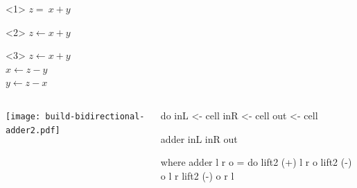 \documentclass[UKenglish,usenames,dvipsnames,svgnames,table,aspectratio=169,mathserif]{beamer}
\newcommand{\nl}{\vspace{\baselineskip}}
\begin{document}
\begin{frame}

\begin{center}
\begin{LARGE}
\begin{overlayarea}{0.2\textwidth}{0.5\textheight}
\begin{onlyenv}<1>
$z =\ x + y$
\end{onlyenv}
\begin{onlyenv}<2>
$z \leftarrow x + y$
\end{onlyenv}
\begin{onlyenv}<3>
$z \leftarrow x + y$ \\
$x \leftarrow z - y$ \\
$y \leftarrow z - x$ \\
\end{onlyenv}
\end{overlayarea}
\end{LARGE}
\end{center}
\end{frame}


\begin{frame}[fragile]
\centering

\begin{columns}
\begin{column}{0.5\textwidth}
\nl
\begin{overlayarea}{0.5\textwidth}{0.4\textheight}
\texttt{[image: build-bidirectional-adder2.pdf]}
\end{overlayarea}
\end{column}

\begin{column}{0.5\textwidth}
\begin{overlayarea}{0.5\textwidth}{0.3\textheight}
\begin{haskellcode}
do
  inL  <- cell
  inR  <- cell
  out  <- cell
\end{haskellcode}
\nl
\begin{haskellcode}
  adder inL inR out
\end{haskellcode}
\end{overlayarea}

\begin{overlayarea}{0.5\textwidth}{0.3\textheight}
\begin{haskellcode}
    where
      adder l r o = do
        lift2 (+) l r o
        lift2 (-) o l r
        lift2 (-) o r l
\end{haskellcode}
\end{overlayarea}
\end{column}

\end{columns}
\end{frame}
\end{document}
